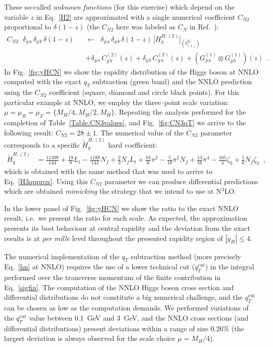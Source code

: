 \documentclass[12pt]{article}
\def\beeq{\begin{eqnarray}}
\def\eeeq{\end{eqnarray}}
\def\nn{\nonumber}
\newcommand\f[2]{\frac{#1}{#2}}
\DeclareRobustCommand{\qt}{q_T}
\DeclareRobustCommand{\qtcut}{\ensuremath{q_T^\mathrm{cut}}}
\begin{document}
These so-called \textit{unknown functions} (for this exercise) which depend on the variable $z$ in Eq.~\eqref{H2} are approximated with a single numerical coefficient $C_{N2}$ proportional to $\delta(1-z)$ (the $C_{N2}$ here was labeled as $C_{N}$ in Ref.~\cite{Bozzi:2005wk}):
\beeq
\label{CNeq}
C_{N2}\;\;\delta_{g\,a} \,\delta_{g\,b} \,\delta(1-z) && \!\!\!\!\!\! \leftarrow\;\; \delta_{g\,a} \,\delta_{g\,b} \,\delta(1-z)
\, \big[H^{H;(2)}_{g}\big]_{(\delta^{\qt}_{(1)})}\nn\\
&&+\delta_{g\,a} \,C^{(2)}_{g\,b}(z)+\delta_{g\,b} \,C^{(2)}_{g\,a}(z)+
\left(G^{(1)}_{g\,a}\otimes G^{(1)}_{g\,b}\right)(z)\;\; .
\eeeq 
In Fig.~\ref{fig:yHCN} we show the rapidity distribution of the Higgs boson at NNLO computed with the exact $\qt$ subtraction (green band) and the NNLO prediction using the $C_{N2}$ coefficient (square, diamond and circle black points). For this particular example at NNLO, we employ the three--point scale variation: $\mu=\mu_{R}=\mu_{F}=\{M_{H}/4,M_{H}/2,M_{H}\}$. Repeating the analysis performed for the completion of Table~\ref{Table:CN3values}, and Fig.~\ref{fig:CN3qT} we arrive to the following result: $C_{N2}=28\pm 1$. The numerical value of the $C_{N2}$ parameter corresponds to a specific $\widetilde{H}^{H;(2)}_{g}$ hard coefficient:
\begin{align}
\label{Ht2g}
\widetilde{H}^{H;(2)}_{g}&=\f{11399}{144}+\f{19}{8} L_{t}-\f{1189}{144} N_{f}+\f{2}{3} N_{f} L_{t}+\f{83}{6} \pi^{2} -\f{5}{18} \pi^{2} N_{f} + \f{13}{16} \pi^{4} - \f{165}{4} \zeta_{3} + \f{5}{6} N_{f} \zeta_{3}\;\;,
\end{align}
which is obtained with the same method that was used to arrive to Eq.~\eqref{H3approx}.
Using this $C_{N2}$ parameter we can produce differential predictions which are obtained \textit{mimicking} the strategy that we intend to use at N$^{3}$LO. 

In the lower panel of Fig.~\ref{fig:yHCN} we show the ratio to the exact NNLO result, i.e.\ we present the ratio for each scale. As expected, the approximation presents its best behaviour at central rapidity and the deviation from the exact results is at \textit{per mille} level throughout the presented rapidity region of $|y_{H}|\leq 4$.

The numerical implementation of the $\qt$ subtraction method (more precisely Eq.~\eqref{hn} at NNLO) requires the use of a lower technical cut ($\qtcut$) in the integral performed over the transverse momentum of the finite contribution in Eq.~\eqref{sigfin}. The computation of the NNLO Higgs boson cross section and differential distributions do not constitute a big numerical challenge, and the $\qtcut$ can be chosen as low as the computation demands. We performed variations of the $\qtcut$ value between 0.1~GeV and 3~GeV, and the NNLO cross sections (and differential distributions) present deviations within a range of size $0.26\%$  (the largest deviation is always observed for the scale choice $\mu=M_{H}/4$).
\end{document}
